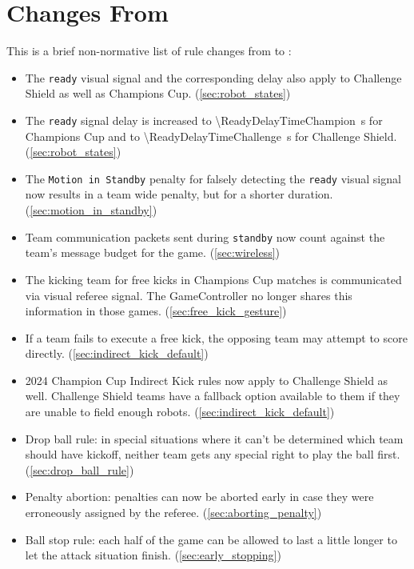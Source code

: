 \section{Changes From \LastRCYear}

This is a brief non-normative list of rule changes from \LastRCYear to \RCYear:
\begin{itemize}
  \item The \texttt{ready} visual signal and the corresponding delay
        also apply to Challenge Shield as well as Champions Cup.
        (\cref{sec:robot_states})
  \item The \texttt{ready} signal delay is increased to
        \qty{\ReadyDelayTimeChampion}{\second} for Champions Cup and to
        \qty{\ReadyDelayTimeChallenge}{\second} for Challenge Shield.
        (\cref{sec:robot_states})
  \item The \texttt{Motion in Standby} penalty for falsely detecting the
        \texttt{ready} visual signal now results in a team wide penalty,
        but for a shorter duration. (\cref{sec:motion_in_standby})
  \item Team communication packets sent during \texttt{standby} now count
        against the team's message budget for the game. (\cref{sec:wireless})

  \item The kicking team for free kicks in Champions Cup matches is communicated
        via visual referee signal. The GameController no longer shares this
        information in those games. (\cref{sec:free_kick_gesture})
  \item If a team fails to execute a free kick, the opposing team
        may attempt to score directly. (\cref{sec:indirect_kick_default})

  \item 2024 Champion Cup Indirect Kick rules now apply to Challenge Shield as well.
        Challenge Shield teams have a fallback option available to them if they
        are unable to field enough robots. (\cref{sec:indirect_kick_default})

  \item Drop ball rule: in special situations where it can't be determined
        which team should have kickoff, neither team gets any special right
        to play the ball first. (\cref{sec:drop_ball_rule})
  \item Penalty abortion: penalties can now be aborted early in case they were
        erroneously assigned by the referee. (\cref{sec:aborting_penalty})
  \item Ball stop rule: each half of the game can be allowed to last
        a little longer to let the attack situation finish. (\cref{sec:early_stopping})
\end{itemize}
